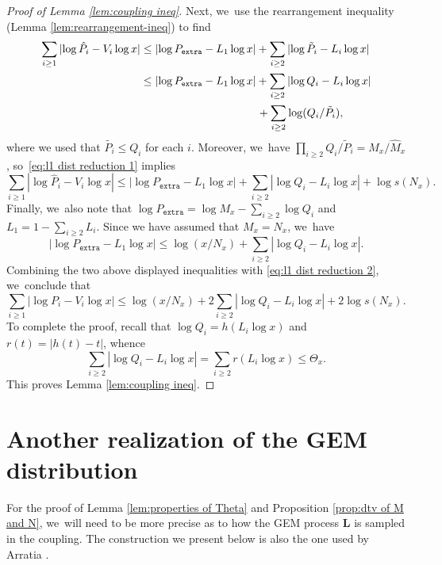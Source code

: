 \documentclass[10pt]{amsart}
\newcommand{\bL}{{\boldsymbol L}}
\newcommand{\pextra}{P_{\mathtt{extra}}}
\theoremstyle{plain}
\theoremstyle{definition}
\begin{document}
\begin{proof}[Proof of Lemma \ref{lem:coupling ineq}]
Next, we~use the rearrangement inequality (Lemma \ref{lem:rearrangement-ineq}) to find
\begin{align*}
\sum_{i \ge 1} |{\log \hat P_i - V_i\log x}| &\le |{\log \pextra - L_1\log x}|+ \sum_{i \ge 2} |{\log \tilde P_i - L_i\log x}| \\
&\le |{\log \pextra - L_1\log x}|+ \sum_{i \ge 2} |{\log Q_i - L_i\log x}| \\
&\hspace*{3.7cm} + \sum_{i \ge 2} \log(Q_i/\tilde P_i),
\end{align*}
where we used that $\tilde{P_i}\le Q_i$ for each $i$. Moreover, we~have $\prod_{i \ge 2} Q_i/\tilde P_i = M_x/\hat M_x$, so~\eqref{eq:l1 dist reduction 1} implies
\[
\sum_{i \ge 1} |{\log \hat P_i - V_i\log x}|
\le |{\log \pextra - L_1\log x}|+ \sum_{i \ge 2} |{\log Q_i - L_i\log x}| + \log s(N_x).
\]
Finally, we~also note that $\log \pextra = \log M_x - \sum_{i \ge 2} \log Q_i$ and $L_1 = 1-\sum_{i \ge 2} L_i$. Since we have assumed that $M_x=N_x$, we~have
\[
\label{eq:l1 dist reduction 4}
|{\log \pextra - L_1\log x}| \le \log(x/N_x) + \sum_{i \ge 2} |{\log Q_i - L_i\log x}|.
\]
Combining the two above displayed inequalities with \eqref{eq:l1 dist reduction 2}, we~conclude that
\[
\sum_{i \ge 1} |{\log P_i - V_i\log x}|\le \log(x/N_x) + 2\sum_{i \ge 2} |{\log Q_i - L_i\log x}| + 2\log s(N_x).
\]
To complete the proof, recall that $\log Q_i = h(L_i\log x)$ and $r(t) = |h(t) - t|$, whence
\[
\label{eq:l1 dist reduction 6}
\sum_{i \ge 2} |{\log Q_i - L_i\log x}| = \sum_{i \ge 2} r(L_i\log x) \le \Theta_x.
\]
This proves Lemma \ref{lem:coupling ineq}.
\end{proof}

\section{Another realization of the GEM distribution}
\label{sec:GEM}

For the proof of Lemma \ref{lem:properties of Theta} and Proposition \ref{prop:dtv of M and N}, we~will need to be more precise as to how the GEM process $\bL$ is sampled in the coupling. The construction we present below is also the one used by Arratia \cite{Arratia02}.
\end{document}
